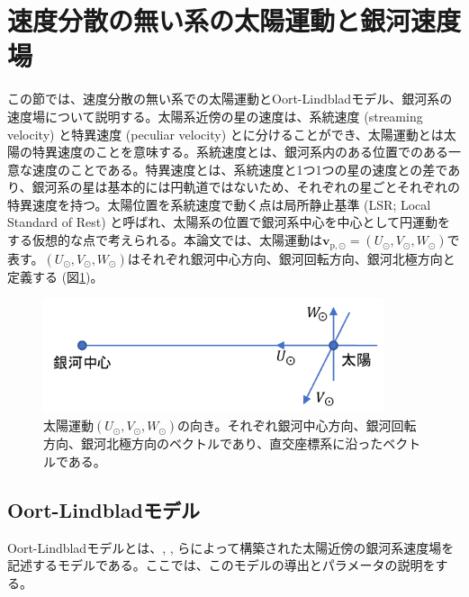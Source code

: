 \section{速度分散の無い系の太陽運動と銀河速度場} %
この節では、速度分散の無い系での太陽運動とOort-Lindbladモデル、銀河系の速度場について説明する。太陽系近傍の星の速度は、系統速度 (streaming velocity) と特異速度 (peculiar velocity) とに分けることができ、太陽運動とは太陽の特異速度のことを意味する。系統速度とは、銀河系内のある位置でのある一意な速度のことである。特異速度とは、系統速度と1つ1つの星の速度との差であり、銀河系の星は基本的には円軌道ではないため、それぞれの星ごとそれぞれの特異速度を持つ。太陽位置を系統速度で動く点は局所静止基準 (LSR; Local Standard of Rest) と呼ばれ、太陽系の位置で銀河系中心を中心として円運動をする仮想的な点で考えられる。本論文では、太陽運動は$\pmb{v}_{\mathrm{p},\odot} = (U_{\odot},V_{\odot},W_{\odot})$で表す。$(U_{\odot},V_{\odot},W_{\odot})$はそれぞれ銀河中心方向、銀河回転方向、銀河北極方向と定義する (図\ref{fig:SolarMotion})。
\begin{figure}[htbp]
\begin{center}
	\includegraphics[width=10cm]{fig/SolarMotion.pdf}
	\caption{太陽運動$(U_{\odot},V_{\odot},W_{\odot})$の向き。それぞれ銀河中心方向、銀河回転方向、銀河北極方向のベクトルであり、直交座標系に沿ったベクトルである。}
	\label{fig:SolarMotion}
\end{center}
\end{figure}


\subsection{Oort-Lindbladモデル} %
Oort-Lindbladモデルとは、\cite{Oort1927b}, \cite{Lindblad1927}, \cite{Chandra42}らによって構築された太陽近傍の銀河系速度場を記述するモデルである。ここでは、このモデルの導出とパラメータの説明をする。

